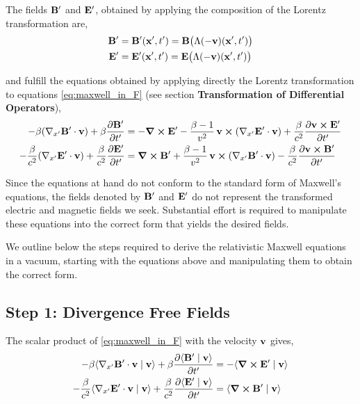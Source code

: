 \documentclass[12pt]{article}
\newcommand{\ip}[2]{\langle #1 \mid #2 \rangle}
\begin{document}
The fields $\vb{B}'$ and $\vb{E}'$, obtained by applying the composition of the Lorentz
transformation are,
\begin{align}
  \vb{B}' &= \vb{B}'(\vb{x}',t') = \vb{B}\bigl(\Lambda(-\vb{v})(\vb{x}',t')\bigr) \\
  \vb{E}' &= \vb{E}'(\vb{x}',t') = \vb{E}\bigl(\Lambda(-\vb{v})(\vb{x}',t')\bigr)
\end{align}

and fulfill the equations obtained by applying directly the Lorentz transformation to
equations \eqref{eq:maxwell_in_F} (see section \textbf{Transformation of Differential
Operators}),
\begin{align}
  -\beta(\nabla_{x'}\vb{B}' \cdot \vb{v}) + \beta\pdv{\vb{B}'}{t'}
    &= -\curl \vb{E}'
       - \frac{\beta-1}{v^2}\,\vb{v} \cross (\nabla_{x'}\vb{E}' \cdot \vb{v})
       + \frac{\beta}{c^2}\pdv{\vb{v} \cross \vb{E}'}{t'} \label{eq:maxwell_transformed} \\
  -\frac{\beta}{c^2}(\nabla_{x'}\vb{E}' \cdot \vb{v}) + \frac{\beta}{c^2}\pdv{\vb{E}'}{t'}
    &= \curl \vb{B}'
       + \frac{\beta-1}{v^2}\,\vb{v} \cross (\nabla_{x'}\vb{B}' \cdot \vb{v})
       - \frac{\beta}{c^2}\pdv{\vb{v} \cross \vb{B}'}{t'} \nonumber
\end{align}

Since the equations at hand do not conform to the standard form of Maxwell's equations, the
fields denoted by $\vb{B}'$ and $\vb{E}'$ do not represent the transformed electric and
magnetic fields we seek. Substantial effort is required to manipulate these equations into the
correct form that yields the desired fields.

We outline below the steps required to derive the relativistic Maxwell equations in a vacuum,
starting with the equations above and manipulating them to obtain the correct form.

\subsection{Step 1: Divergence Free Fields}

The scalar product of \eqref{eq:maxwell_in_F} with the velocity $\vb{v}$ gives,
\begin{align}
  -\beta\ip{\nabla_{x'}\vb{B}' \cdot \vb{v}}{\vb{v}}
    + \beta\pdv{\ip{\vb{B}'}{\vb{v}}}{t'}
    &= -\ip{\curl \vb{E}'}{\vb{v}} \\
  -\frac{\beta}{c^2}\ip{\nabla_{x'}\vb{E}' \cdot \vb{v}}{\vb{v}}
    + \frac{\beta}{c^2}\pdv{\ip{\vb{E}'}{\vb{v}}}{t'}
    &= \ip{\curl \vb{B}'}{\vb{v}}
\end{align}
\end{document}
